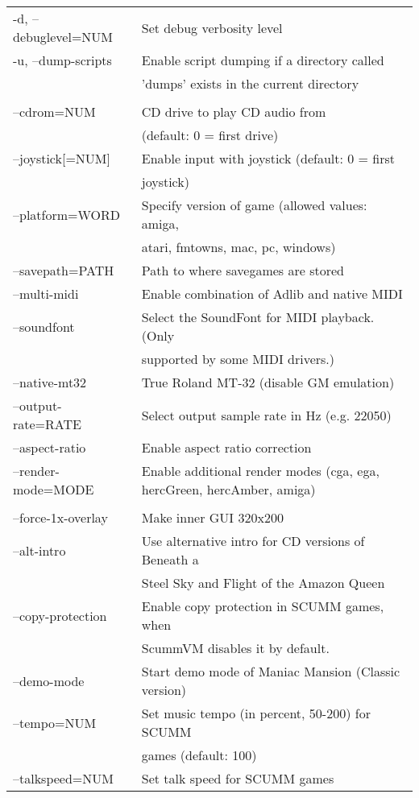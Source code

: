 \begin{tabular}{ll}
  -d, --debuglevel=NUM    &Set debug verbosity level\\
  -u, --dump-scripts      &Enable script dumping if a directory called\\
                          &'dumps' exists in the current directory\\
\\
  --cdrom=NUM             &CD drive to play CD audio from\\
                          &(default: 0 = first drive)\\
  --joystick[=NUM]        &Enable input with joystick (default: 0 = first\\
                          &joystick)\\
  --platform=WORD         &Specify version of game (allowed values: amiga,\\
                          &atari, fmtowns, mac, pc, windows)\\
  --savepath=PATH         &Path to where savegames are stored\\
  --multi-midi            &Enable combination of Adlib and native MIDI\\
  --soundfont             &Select the SoundFont for MIDI playback. (Only\\
                          &supported by some MIDI drivers.)\\
  --native-mt32           &True Roland MT-32 (disable GM emulation)\\
  --output-rate=RATE      &Select output sample rate in Hz (e.g. 22050)\\
  --aspect-ratio          &Enable aspect ratio correction\\
  --render-mode=MODE      &Enable additional render modes (cga, ega, hercGreen, hercAmber, amiga)\\
\\
  --force-1x-overlay      &Make inner GUI 320x200\\
  --alt-intro             &Use alternative intro for CD versions of Beneath a\\
                          &Steel Sky and Flight of the Amazon Queen\\
  --copy-protection       &Enable copy protection in SCUMM games, when\\
                          &ScummVM disables it by default.\\
  --demo-mode             &Start demo mode of Maniac Mansion (Classic version)\\
  --tempo=NUM             &Set music tempo (in percent, 50-200) for SCUMM\\
                          &games (default: 100)\\
  --talkspeed=NUM         &Set talk speed for SCUMM games\\
\end{tabular}

